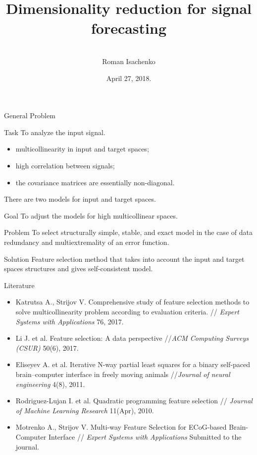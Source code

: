 \documentclass[9pt]{beamer}
\title[\hbox to 56mm{  \hfill\insertframenumber\,/\,\inserttotalframenumber}]
{\\ \vspace{1.5cm} Dimensionality reduction for signal forecasting}
\author[Roman Isachenko]{\\ 
	\vspace{.4cm}
	Roman Isachenko}
\institute[SkolTech]{Skoltech advisor: Maxim Fedorov \\ 
	\vspace{0.1cm}
	 MIPT advisor: Vadim Strijov
}
\date{April 27, 2018.}
\begin{document}
\begin{frame}
\titlepage
\end{frame}
\begin{frame}{General Problem}
	\begin{block}{Task}
		To analyze the input signal.
		\begin{itemize}
			\item multicollinearity in input and target spaces;
			\item high correlation between signals;
			\item the covariance matrices are essentially non-diagonal.
		\end{itemize}
	There are two models for input and target spaces. 
	\end{block}
	\begin{block}{Goal}
		To adjust the models for high multicollinear spaces.
	\end{block}
	\begin{block}{Problem}
		To select structurally simple, stable, and exact model in the case of data redundancy and multiextremality of an error function.
	\end{block}
	\begin{block}{Solution}
		Feature selection method that takes into account the input and target spaces structures and gives self-consistent model.
	\end{block}
\end{frame}
\begin{frame}{Literature}
	\begin{itemize}
		\item Katrutsa A., Strijov V. Comprehensive study of feature selection methods to solve multicollinearity problem according to evaluation criteria. // \textit{Expert Systems with Applications} 76, 2017.
		\vfill
		\item Li J. et al. Feature selection: A data perspective //\textit{ACM Computing Surveys (CSUR)} 50(6), 2017.
		\vfill
		\item Eliseyev A. et al. Iterative N-way partial least squares for a binary self-paced brain–computer interface in freely moving animals //\textit{Journal of neural engineering} 4(8), 2011.
		\vfill
		\item Rodriguez-Lujan I. et al. Quadratic programming feature selection // \textit{Journal of Machine Learning Research} 11(Apr), 2010.
		\vfill
		\item Motrenko A., Strijov V. Multi-way Feature Selection for ECoG-based Brain-Computer Interface // \textit{Expert Systems with Applications} Submitted to the journal.
	\end{itemize}
\end{frame}
\end{document}
